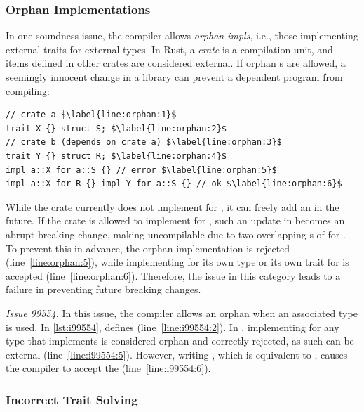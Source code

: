 \subsubsection{Orphan Implementations}

In one soundness issue, the compiler allows \emph{orphan impls}, i.e., those
implementing external traits for external types.
%
In Rust, a \emph{crate} is a compilation unit, and items defined in other crates
are considered external.
%
If orphan s are allowed, a seemingly innocent change in a library can
prevent a dependent program from compiling:

\vspace{-0.5em}
\begin{lstlisting}
// crate a $\label{line:orphan:1}$
trait X {} struct S; $\label{line:orphan:2}$
// crate b (depends on crate a) $\label{line:orphan:3}$
trait Y {} struct R; $\label{line:orphan:4}$
impl a::X for a::S {} // error $\label{line:orphan:5}$
impl a::X for R {} impl Y for a::S {} // ok $\label{line:orphan:6}$
\end{lstlisting}
\vspace{-0.5em}

\noindent
%
While the crate  currently does not implement  for , it can
freely add an  in the future.
%
If the crate  is allowed to implement  for , such an update in
 becomes an abrupt breaking change, making  uncompilable due to two
overlapping s of  for .
%
To prevent this in advance, the orphan implementation is rejected
(line~\ref{line:orphan:5}), while implementing  for its own type  or
its own trait  for  is accepted (line~\ref{line:orphan:6}).
%
Therefore, the issue in this category leads to a failure in preventing future
breaking changes.

{\it Issue 99554.}
%
In this issue, the compiler allows an orphan  when an associated type is
used.
%
In \cref{lst:i99554},  defines  (line~\ref{line:i99554:2}).
%
In , implementing  for any type  that implements  is
considered orphan and correctly rejected, as such  can be external
(line~\ref{line:i99554:5}).
%
However, writing , which is equivalent to , causes the
compiler to accept the  (line~\ref{line:i99554:6}).

\subsubsection{Incorrect Trait Solving}

